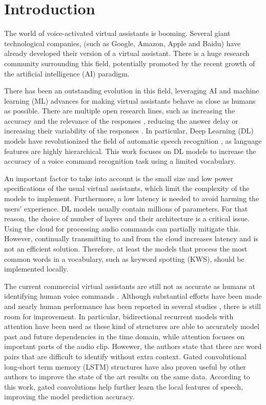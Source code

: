 \documentclass[review]{elsarticle}
\begin{document}
\linenumbers

\section{Introduction}
The world of voice-activated virtual assistants is booming. Several giant technological companies, (such as Google, Amazon, Apple and Baidu) have already developed their version of a virtual assistant. There is a huge research community surrounding this field, potentially promoted by the recent growth of the artificial intelligence (AI) paradigm. 

There has been an outstanding evolution in this field, leveraging AI and machine learning (ML) advances for  making virtual assistants behave as close as humans as possible. There are multiple open research lines, such as increasing the accuracy and the relevance of the responses \cite{milabot2017}, reducing the answer delay \cite{Han2017} or increasing their variability of the responses \cite{Li2017}. In particular, Deep Learning (DL) models have revolutionized the field of automatic speech recognition \cite{Nassif2019}, as language features are highly hierarchical. This work focuses on DL models to increase the accuracy of a voice command recognition task using a limited vocabulary. 

An important factor to take into account is the small size and low power specifications of the usual virtual assistants, which limit the complexity of the models to implement. Furthermore, a low latency is needed to avoid harming the users' experience. DL models usually contain millions of parameters. For that reason, the choice of number of layers and their architecture is a critical issue. Using the cloud for processing audio commands can partially mitigate this. However, continually transmitting to and from the cloud increases latency and is not an efficient solution. Therefore, at least the models that process the most common words in a vocabulary, such as keyword spotting (KWS), should be implemented locally.

The current commercial virtual assistants are still not as accurate as humans at identifying human voice commands \cite{Michaely2017}. Although substantial efforts have been made and nearly human performance has been reported in several studies \cite{Andrade2018, Zhang2017, McMahan2018, Warden2018}, there is still room for improvement. In particular, bidirectional recurrent models with attention have been used  \cite{Andrade2018} as these kind of structures are able to accurately model past and future dependencies in the time domain, while attention focuses on important parts of the audio clip. Howewer, the authors state that there are word pairs that are difficult to identify without extra context. Gated convolutional long-short term memory (LSTM) structures have also proven useful by other authors \cite{Wang2018} to improve the state of the art results on the same data. According to this work, gated convolutions help further learn the local features of speech, improving the model prediction accuracy.
\end{document}
